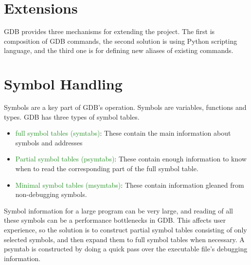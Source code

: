 \section{Extensions}
GDB provides three mechanisms for extending the project. The first is
composition of GDB commands, the second solution is using Python scripting
language, and the third one is for defining new aliases of existing commands.

\section{Symbol Handling}
Symbols are a key part of GDB's operation. Symbols are variables, functions and
types. GDB has three types of symbol tables.
\begin{itemize}
    \item \textcolor{ForestGreen}{full symbol tables (symtabs)}: These contain the main information
        about symbols and addresses
    \item \textcolor{ForestGreen} {Partial symbol tables (psymtabs)}: These contain enough information to
        know when to read the corresponding part of the full symbol table.
    \item \textcolor{ForestGreen}{Minimal symbol tables (msymtabs)}: These contain information gleaned
        from non-debugging symbols.
\end{itemize}

Symbol information for a large program can be very large, and reading of all
these symbols can be a performance bottlenecks in GDB. This affects user
experience, so the solution is to construct partial symbol tables consisting of
only selected symbols, and then expand them to full symbol tables when
necessary.
A psymtab is constructed by doing a quick pass over the executable file's
debugging information.
